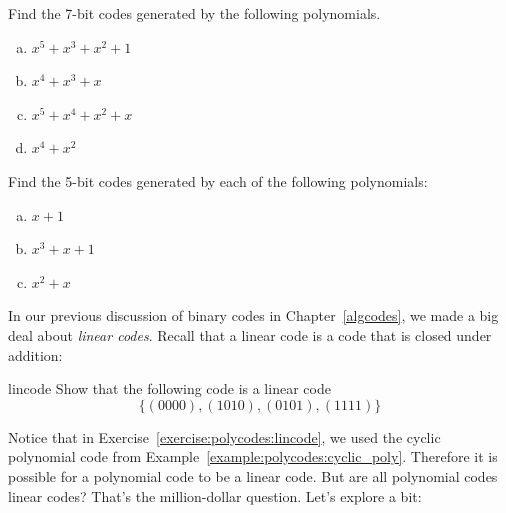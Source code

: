 \begin{exercise}{}
Find the 7-bit codes generated by the following polynomials.
\begin{enumerate}[(a)]
\item $x^5 + x^3 + x^2 + 1$
\item $x^4 + x^3 + x$
\item $x^5 + x^4 + x^2 + x$
\item $x^4 + x^2$
\end {enumerate}
\end {exercise}
%

\begin{exercise}{}
Find the 5-bit codes generated by each of the following polynomials: 
\begin{enumerate}[(a)]
\item $x + 1$
\item $x^3+x+1$
\item $x^2 + x$
\end{enumerate}
\end {exercise}


In our previous discussion of binary codes in Chapter~\ref{algcodes}, we made a big deal about \emph{linear codes}.  Recall that a linear code is a code that is closed under addition:  

\begin{exercise}{lincode}
Show that the following code is a linear code
\[\{(0000),(1010),(0101),(1111)\}\]
\end {exercise}

Notice that in Exercise~\ref{exercise:polycodes:lincode}, we used the cyclic polynomial code from Example~\ref{example:polycodes:cyclic_poly}.  Therefore it is possible for a polynomial code to be a linear code.  But are all polynomial codes linear codes? That's the million-dollar question. Let's explore a bit:


